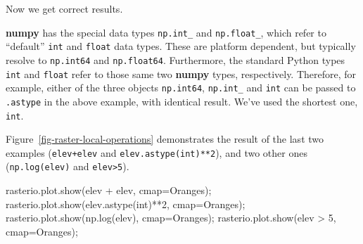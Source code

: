 \documentclass[
  letterpaper,
]{krantz}
\newenvironment{Shaded}{\begin{snugshade}}{\end{snugshade}}
\newcommand{\BuiltInTok}[1]{\textcolor[rgb]{0.00,0.23,0.31}{#1}}
\newcommand{\DecValTok}[1]{\textcolor[rgb]{0.68,0.00,0.00}{#1}}
\newcommand{\NormalTok}[1]{\textcolor[rgb]{0.00,0.23,0.31}{#1}}
\newcommand{\OperatorTok}[1]{\textcolor[rgb]{0.37,0.37,0.37}{#1}}
\newcommand{\StringTok}[1]{\textcolor[rgb]{0.13,0.47,0.30}{#1}}
\begin{document}
Now we get correct results.

\begin{tcolorbox}[enhanced jigsaw, title=\textcolor{quarto-callout-note-color}{\faInfo}\hspace{0.5em}{Note}, coltitle=black, colbacktitle=quarto-callout-note-color!10!white, breakable, titlerule=0mm, colframe=quarto-callout-note-color-frame, opacitybacktitle=0.6, colback=white, bottomrule=.15mm, left=2mm, leftrule=.75mm, toprule=.15mm, toptitle=1mm, bottomtitle=1mm, arc=.35mm, opacityback=0, rightrule=.15mm]

\textbf{numpy} has the special data types \texttt{np.int\_} and
\texttt{np.float\_}, which refer to ``default'' \texttt{int} and
\texttt{float} data types. These are platform dependent, but typically
resolve to \texttt{np.int64} and \texttt{np.float64}. Furthermore, the
standard Python types \texttt{int} and \texttt{float} refer to those
same two \textbf{numpy} types, respectively. Therefore, for example,
either of the three objects \texttt{np.int64}, \texttt{np.int\_} and
\texttt{int} can be passed to \texttt{.astype} in the above example,
with identical result. We've used the shortest one, \texttt{int}.

\end{tcolorbox}

Figure~\ref{fig-raster-local-operations} demonstrates the result of the
last two examples (\texttt{elev+elev} and \texttt{elev.astype(int)**2}),
and two other ones (\texttt{np.log(elev)} and
\texttt{elev\textgreater{}5}).

\begin{Shaded}
\begin{Highlighting}[]
\NormalTok{rasterio.plot.show(elev }\OperatorTok{+}\NormalTok{ elev, cmap}\OperatorTok{=}\StringTok{\textquotesingle{}Oranges\textquotesingle{}}\NormalTok{)}\OperatorTok{;}
\NormalTok{rasterio.plot.show(elev.astype(}\BuiltInTok{int}\NormalTok{)}\OperatorTok{**}\DecValTok{2}\NormalTok{, cmap}\OperatorTok{=}\StringTok{\textquotesingle{}Oranges\textquotesingle{}}\NormalTok{)}\OperatorTok{;}
\NormalTok{rasterio.plot.show(np.log(elev), cmap}\OperatorTok{=}\StringTok{\textquotesingle{}Oranges\textquotesingle{}}\NormalTok{)}\OperatorTok{;}
\NormalTok{rasterio.plot.show(elev }\OperatorTok{\textgreater{}} \DecValTok{5}\NormalTok{, cmap}\OperatorTok{=}\StringTok{\textquotesingle{}Oranges\textquotesingle{}}\NormalTok{)}\OperatorTok{;}
\end{Highlighting}
\end{Shaded}
\end{document}
